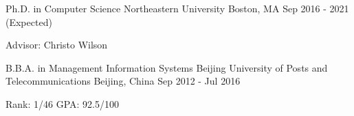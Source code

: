\documentclass[letterpaper]{awesome-cv}
\begin{document}
\makecvheader

\addvspace{4ex}
\begin{cventries}
  \cventry
    {Ph.D. in Computer Science}
    {Northeastern University}
    {Boston, MA}
    {Sep 2016 - 2021 (Expected)}
    {
      \begin{cvitems}
        \item {Advisor: Christo Wilson}
      \end{cvitems}
    }
  \cventry
    {B.B.A. in Management Information Systems}
    {Beijing University of Posts and Telecommunications}
    {Beijing, China}
    {Sep 2012 - Jul 2016}
    {
      \begin{cvitems}
        \item {Rank: 1/46 \hspace{0.5ex} GPA: 92.5/100}
      \end{cvitems}
    }
\end{cventries}

\end{document}
